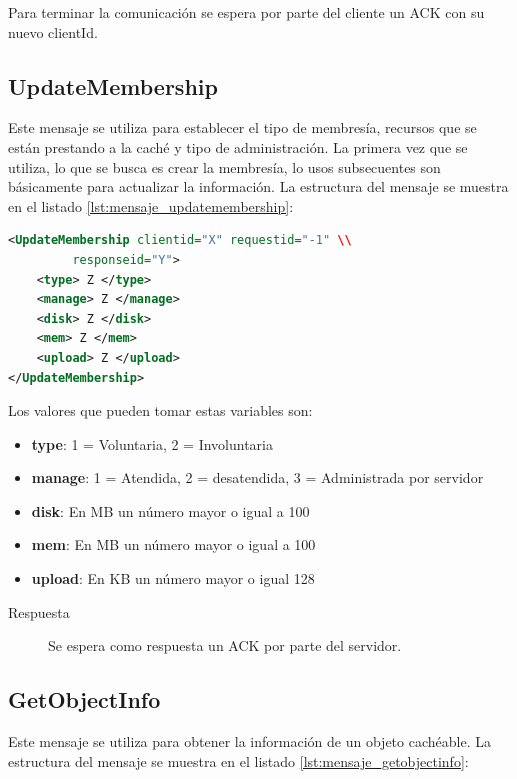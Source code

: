 Para terminar la comunicación se espera por parte del cliente un ACK con su nuevo clientId.

\subsection{UpdateMembership}

Este mensaje se utiliza para establecer el tipo de membresía, recursos que se están prestando a la caché y tipo de administración. La primera vez que se utiliza, lo que se busca es crear la membresía, lo usos subsecuentes son básicamente para actualizar la información. La estructura del mensaje se muestra en el listado \ref{lst:mensaje_updatemembership}:

\begin{lstlisting}[language=XML,caption={Mensaje de UpdateMembership},label={lst:mensaje_updatemembership}]
<UpdateMembership clientid="X" requestid="-1" \\
		 responseid="Y"> 
	<type> Z </type>
	<manage> Z </manage>
	<disk> Z </disk>
	<mem> Z </mem>
	<upload> Z </upload>
</UpdateMembership>
\end{lstlisting}

Los valores que pueden tomar estas variables son:

\begin{itemize}
\item \textbf{type}: 1 = Voluntaria, 2 = Involuntaria
\item \textbf{manage}: 1 = Atendida, 2 = desatendida, 3 = Administrada por servidor
\item \textbf{disk}: En MB un número mayor o igual a 100
\item \textbf{mem}: En MB un número mayor o igual a 100
\item \textbf{upload}: En KB un número mayor o igual 128
\end{itemize}

\begin{description}
\item[Respuesta] Se espera como respuesta un ACK por parte del servidor.
\end{description}

\subsection{GetObjectInfo}
Este mensaje se utiliza para obtener la información de un objeto cachéable. La estructura del mensaje se muestra en el listado \ref{lst:mensaje_getobjectinfo}:

